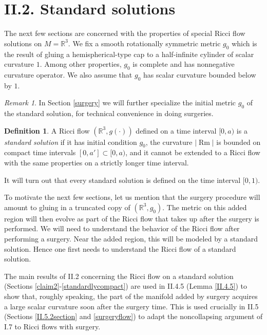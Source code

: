 \documentclass[12pt]{amsart}
\newcommand{\R}{{\mathbb R}}
\newcommand{\Rm}{\operatorname{Rm}}
\numberwithin{equation}{section}
\theoremstyle{plain}
\theoremstyle{definition}
\newtheorem{definition}[equation]{Definition}
\theoremstyle{remark}
\newtheorem{remark}[equation]{Remark}
\begin{document}
\section{II.2. Standard solutions} \label{II.2}



The next few sections are concerned with the properties of  special
Ricci flow solutions on $M=\R^3$. 
We fix a smooth rotationally symmetric   metric $g_0$ which
is the result of gluing a hemispherical-type cap to a 
half-infinite cylinder of scalar curvature $1$. 
Among other properties, $g_0$ is complete and has
nonnegative  curvature operator.
We also assume that $g_0$ has scalar curvature
bounded below by $1$.

\begin{remark}
In Section \ref{surgery} we will further specialize the initial metric
$g_0$ of the standard solution, for technical convenience in
doing surgeries.
\end{remark}

\begin{definition}
\label{defstandardsolution}
A Ricci flow $(\R^3,g(\cdot))$  defined on a time interval $[0,a)$
is a {\em standard solution} if
it has  initial condition $g_0$, the curvature $|\Rm|$ is bounded 
on compact time intervals $[0,a']\subset [0,a)$, and it cannot
be extended to a Ricci flow with the same properties 
on a strictly longer time interval. 
\end{definition}

It will turn out that every standard solution 
is defined on the time interval $[0,1)$.

To motivate the next few sections, let us mention that the surgery
procedure will amount to gluing in a truncated copy of 
$(\R^3, g_0)$. The metric on this added region will then evolve as 
part of the Ricci flow that takes up after the surgery is performed. 
We will need to understand
the behavior of the Ricci flow after performing a surgery. Near
the added region, this will be modeled by a standard solution. 
Hence one first needs to understand the Ricci flow of a standard
solution.

The main results of II.2 concerning the Ricci flow on a standard solution
(Sections \ref{claim2}-\ref{standardlycompact}) are used in
II.4.5 (Lemma \ref{II.4.5}) to show that,
roughly speaking, the part of the manifold added by surgery 
acquires a large scalar curvature soon after the surgery time.  This
is used crucially in II.5 (Sections \ref{II.5.2section} and \ref{surgeryflow})
to adapt the noncollapsing argument of I.7 to Ricci flows
with surgery.
\end{document}

